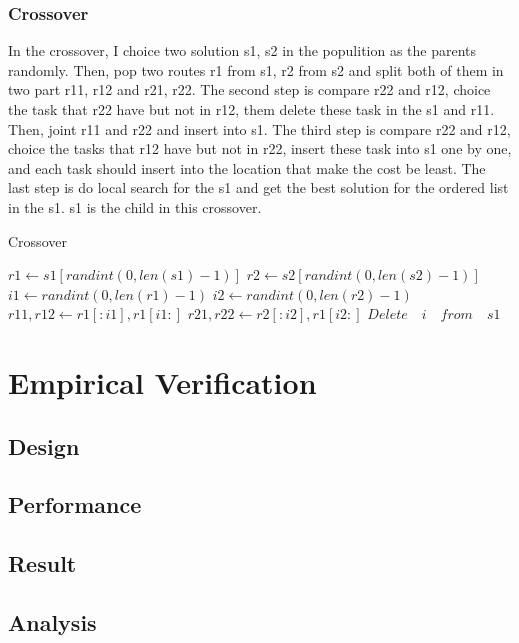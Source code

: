 \documentclass[conference,compsoc]{IEEEtran}
\begin{document}
    \subsubsection{Crossover}
    In the crossover, I choice two solution s1, s2 in the populition as the parents randomly. Then, pop two routes r1 from s1, r2 from s2 and split both of them in two part r11, r12 and r21, r22.
    The second step is compare r22 and r12, choice the task that r22 have but not in r12, them delete these task in the s1 and r11. Then, joint r11 and r22 and insert into s1.
    The third step is compare r22 and r12, choice the tasks that r12 have but not in r22, insert these task into s1 one by one, and each task should insert into the location that make the cost be least.
    The last step is do local search for the s1 and get the best solution for the ordered list in the s1. s1 is the child in this crossover.
    \begin{algorithm}
      \caption{Crossover}
      \begin{algorithmic}[1]
          \State $r1 \gets s1[randint(0, len(s1)-1)]$
          \State $r2 \gets s2[randint(0, len(s2)-1)]$
          \State $i1 \gets randint(0, len(r1)-1)$
          \State $i2 \gets randint(0,len(r2)-1)$
          \State $r11,r12 \gets r1[:i1],r1[i1:]$
          \State $r21,r22 \gets r2[:i2],r1[i2:]$          
              \State$Delete\quad i\quad from\quad s1$
            \EndIf
          \EndFor 
        \EndFunction
      \end{algorithmic}
    \end{algorithm}
\section{Empirical Verification}
  \subsection{Design}

  \subsection{Performance}

  \subsection{Result}

  \subsection{Analysis}



\cite{rivest1987game}
\cite{knuth1975analysis}
\end{document}
